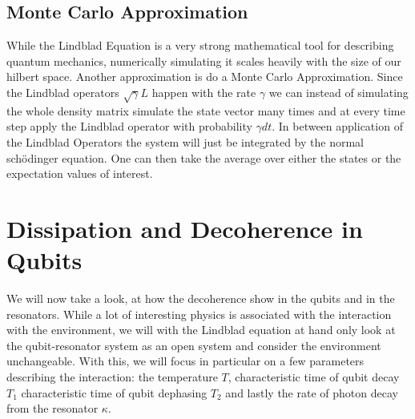 \subsection{Monte Carlo Approximation}
While the Lindblad Equation is a very strong mathematical tool for describing quantum mechanics, numerically simulating it scales heavily with the size of our hilbert space. Another approximation is do a Monte Carlo Approximation. Since the Lindblad operators  $\sqrt{\gamma}L$ happen with the rate $\gamma$ we can instead of simulating the whole density matrix simulate the state vector many times and at every time step apply the Lindblad operator with probability $\gamma dt$. In between application of the Lindblad Operators the system will just be integrated by the normal schödinger equation. One can then take the average over either the states or the expectation values of interest.\cite{qutip}

\section{Dissipation and Decoherence in Qubits}
We will now take a look, at how the decoherence show in the qubits and in the resonators. While a lot of interesting physics is associated with the interaction with the environment, we will with the Lindblad equation at hand only look at the qubit-resonator system as an open system and consider the environment unchangeable. With this, we will focus in particular on a few parameters describing the interaction: the temperature $T$, characteristic time of qubit decay $T_1$ characteristic time of qubit dephasing $T_2$ and lastly the rate of photon decay from the resonator $\kappa$.

